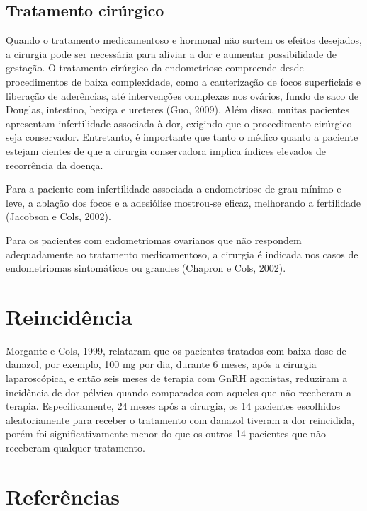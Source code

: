 \documentclass[12pt]{article} %
\begin{document}
\subsection{Tratamento cirúrgico}

Quando o tratamento medicamentoso e hormonal não surtem os efeitos
desejados, a cirurgia pode ser necessária para aliviar a dor e
aumentar possibilidade de gestação.  O tratamento cirúrgico da
endometriose compreende desde procedimentos de baixa complexidade,
como a cauterização de focos superficiais e liberação de aderências, até
intervenções complexas nos ovários, fundo de saco de Douglas,
intestino, bexiga e ureteres (Guo, 2009). Além disso, muitas pacientes
apresentam infertilidade associada à dor, exigindo que o procedimento
cirúrgico seja conservador. Entretanto, é importante que tanto o
médico quanto a paciente estejam cientes de que a cirurgia
conservadora implica índices elevados de recorrência da doença. %

Para a paciente com infertilidade associada a endometriose de grau
mínimo e leve, a ablação dos focos e a adesiólise mostrou-se eficaz,
melhorando a fertilidade (Jacobson e Cols, 2002).

Para os pacientes com endometriomas ovarianos que não respondem
adequadamente ao tratamento medicamentoso, a cirurgia é indicada nos
casos de endometriomas sintomáticos ou grandes (Chapron e Cols, 2002).

\section{Reincidência}

Morgante e Cols, 1999, relataram que os pacientes tratados com baixa
dose de danazol, por exemplo, 100 mg por dia, durante 6 meses, após a
cirurgia laparoscópica, e então seis meses de terapia com GnRH
agonistas, reduziram a incidência de dor pélvica quando comparados com
aqueles que não receberam a terapia. Especificamente, 24 meses após a
cirurgia, os 14 pacientes escolhidos aleatoriamente para receber o
tratamento com danazol tiveram a dor reincidida, porém foi
significativamente menor do que os outros 14 pacientes que não
receberam qualquer tratamento.

\section{Referências} 
\end{document}

